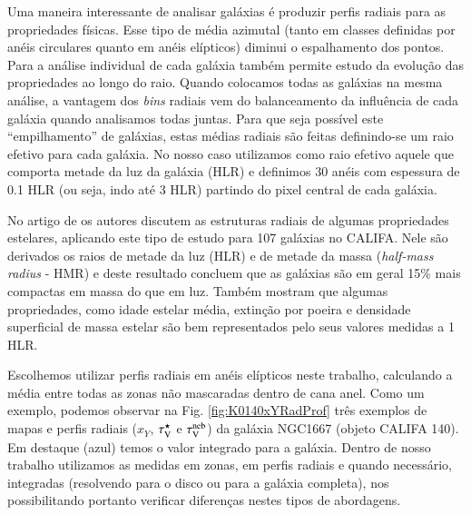 Uma maneira interessante de analisar galáxias é produzir perfis radiais para as propriedades
físicas. Esse tipo de média azimutal (tanto em classes definidas por anéis circulares quanto em
anéis elípticos) diminui o espalhamento dos pontos. Para a análise individual de cada galáxia também
permite estudo da evolução das propriedades ao longo do raio. Quando colocamos todas as galáxias na
mesma análise, a vantagem dos {\em bins} radiais vem do balanceamento da influência de cada galáxia
quando analisamos todas juntas. Para que seja possível este ``empilhamento'' de galáxias, estas
médias radiais são feitas definindo-se um raio efetivo para cada galáxia. No nosso caso utilizamos
como raio efetivo aquele que comporta metade da luz da galáxia (HLR) e definimos 30 anéis com
espessura de 0.1 HLR (ou seja, indo até 3 HLR) partindo do pixel central de cada galáxia.

No artigo de \citet{GonzalezDelgado.etal.2014a} os autores discutem as estruturas radiais de algumas
propriedades estelares, aplicando este tipo de estudo para 107 galáxias no CALIFA. Nele são
derivados os raios de metade da luz (HLR) e de metade da massa ({\em half-mass radius} - HMR) e
deste resultado concluem que as galáxias são em geral 15\% mais compactas em massa do que em luz.
Também mostram que algumas propriedades, como idade estelar média, extinção por poeira e densidade
superficial de massa estelar são bem representados pelo seus valores medidas a 1 HLR.

Escolhemos utilizar perfis radiais em anéis elípticos neste trabalho, calculando a média entre todas
as zonas não mascaradas dentro de cana anel. Como um exemplo, podemos observar na Fig.
\ref{fig:K0140xYRadProf} três exemplos de mapas e perfis radiais ($x_Y$, $\tau_{\mathrm{V}}^\star$ e $\tau_{\mathrm{V}}^{\mathrm{neb}}$) da
galáxia NGC1667 (objeto CALIFA 140). Em destaque (azul) temos o valor integrado para a galáxia.
Dentro de nosso trabalho utilizamos as medidas em zonas, em perfis radiais e quando necessário,
integradas (resolvendo para o disco ou para a galáxia completa), nos possibilitando portanto
verificar diferenças nestes tipos de abordagens.

